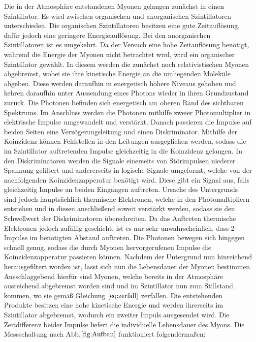  Die in der Atmosphäre entstandenen Myonen gelangen zunächst in einen Szintillator. Es wird zwischen organischen und anorganischen Szintillatoren unterschieden. Die organischen Szintillatoren besitzen eine gute Zeitauflösung, dafür jedoch eine geringere Energieauflösung. Bei den anorganischen Szintillatoren ist es umgekehrt. Da der Versuch eine hohe Zeitauflösung benötigt, während die Energie der Myonen nicht betrachtet wird, wird ein organischer Szintillator gewählt. In diesem werden die zunächst noch relativistischen Myonen abgebremst, wobei sie ihre kinetische Energie an die umliegenden Moleküle abgeben. Diese werden daraufhin in energetisch höhere Niveaus gehoben und kehren daraufhin unter Aussendung eines Photons wieder in ihren Grundzustand zurück. Die Photonen befinden sich energetisch am oberen Rand des sichtbaren Spektrums. Im Anschluss werden die Photonen mithilfe zweier Photomultiplier in elektrische Impulse umgewandelt und verstärkt.
   Danach passieren die Impulse auf beiden Seiten eine Verzögerungsleitung und einen Diskriminator. Mithilfe der Koinzidenz können Fehlstellen in den Leitungen ausgeglichen werden, sodass die im Szintillator auftretenden Impulse gleichzeitig in die Koinzidenz gelangen. In den Diskriminatoren werden die Signale einerseits von Störimpulsen niederer Spannung gefiltert und andererseits in logische Signale umgeformt, welche von der nachfolgenden Koinzidenzapperatur benötigt wird.
     Diese gibt ein Signal aus, falls gleichzeitig Impulse an beiden Eingängen auftreten. Ursache des Untergrunds sind jedoch hauptsächlich thermische Elektronen, welche in den Photomultipliern entstehen und in diesen anschließend soweit verstärkt werden, sodass sie den Schwellwert der Diskriminatoren überschreiten. Da das Auftreten thermische Elektronen jedoch zufällig geschieht, ist es nur sehr unwahrscheinlich, dass 2 Impulse im benötigten
     Abstand auftreten. Die Photonen bewegen sich hingegen schnell genug, sodass die durch Myonen hervorgerufenen Impulse die Koinzidenzapperatur passieren können.
   Nachdem der Untergrund nun hinreichend herausgefiltert worden ist, lässt sich nun die Lebensdauer der Myonen bestimmen. Ausschlaggebend hierfür sind Myonen, welche bereits in der Atmosphäre ausreichend abgebremst worden sind und im Szintillator nun zum Stillstand kommen, wo sie gemäß Gleichung $\eqref{eq:zerfall}$ zerfallen.
    Die entstehenden Produkte besitzen eine hohe kinetische Energie und werden ihrerseits im Szintillator abgebremst, wodurch ein zweiter Impuls ausgesendet wird. Die Zeitdifferenz beider Impulse liefert die individuelle Lebensdauer des Myons. Die Messschaltung nach Abb.$ \ref{fig:Aufbau}$ funktioniert folgendermaßen:

